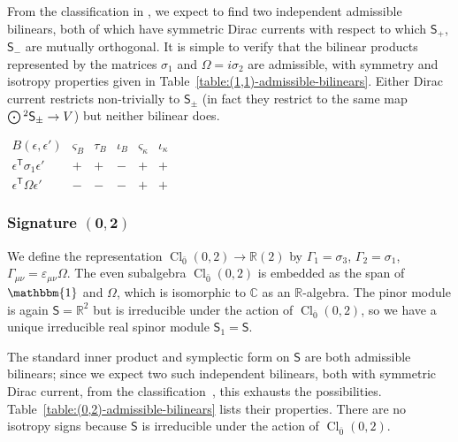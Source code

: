 \documentclass[pdftex]{sigma}
\numberwithin{equation}{section}
\newcommand{\RR}{\mathbb{R}}
\newcommand{\CC}{\mathbb{C}}
\newcommand{\ssS}{\mathsf{S}}
\newcommand{\Odot}{\mathchoice{{\textstyle\bigodot}}{\bigodot}{\bigodot}{\bigodot}}
\newcommand{\1}{\mathbbm{1}}
\DeclareMathOperator{\Cl}{Cl}
\begin{document}
From the classification in \cite{Alekseevsky1997}, we expect to find two independent admissible bilinears, both of which have symmetric Dirac currents with respect to which $\ssS_+$, $\ssS_-$ are mutually orthogonal. It is simple to verify that the bilinear products represented by the matrices $\sigma_1$ and $\Omega=i\sigma_2$ are admissible, with symmetry and isotropy properties given in Table~\ref{table:(1,1)-admissible-bilinears}. Either Dirac current restricts non-trivially to $\ssS_\pm$ (in fact they restrict to the same map $\Odot^2\ssS_\pm\to V$) but neither bilinear does.

\begin{table}[t]
\centering
	\caption{Properties of admissible bilinears and their Dirac currents in signature $(1,1)$.}
	\label{table:(1,1)-admissible-bilinears}
	\setlength{\extrarowheight}{.75ex}
	$\begin{array}{c|ccccc}
		B(\epsilon,\epsilon')	& \varsigma_B & \tau_B	& \iota_B & \varsigma_\kappa & \iota_\kappa	\\
		\hline
		\epsilon^{\mathsf{T}}\sigma_1\epsilon'	& +	& + & - & + & +	\\
		\epsilon^{\mathsf{T}}\Omega\epsilon'	& -	& - & - & + & +
	\end{array}$
\end{table}

\subsubsection[Signature (0,2)]{Signature $\boldsymbol{(0,2)}$}

We define the representation $\Cl_{\bar 0}(0,2)\to \RR(2)$ by
$\Gamma_1 = \sigma_3$,
$\Gamma_2 = \sigma_1$,
$\Gamma_{\mu\nu} = \varepsilon_{\mu\nu}\Omega$.
The even subalgebra $\Cl_{\bar 0}(0,2)$ is embedded as the span of $\1$ and $\Omega$, which is isomorphic to $\CC$ as an $\RR$-algebra. The pinor module is again $\ssS=\RR^2$ but is irreducible under the action of $\Cl_{\overline 0}(0,2)$, so we have a unique irreducible real spinor module $\ssS_1=\ssS$.

The standard inner product and symplectic form on $\ssS$ are both admissible bilinears; since we expect two such independent bilinears, both with symmetric Dirac current, from the classification~\cite{Alekseevsky1997}, this exhausts the possibilities. Table~\ref{table:(0,2)-admissible-bilinears} lists their properties. There are no isotropy signs because $\ssS$ is irreducible under the action of $\Cl_{\overline 0}(0,2)$.
\end{document}
